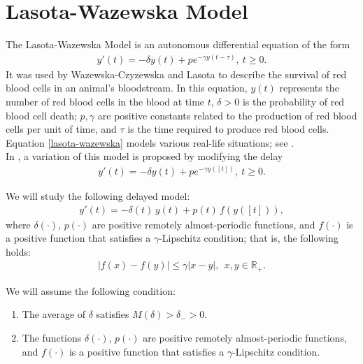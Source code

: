 \documentclass[english,,reqno]{amsart}
\numberwithin{equation}{section}
\newcommand{\bb}[1]{\mathbb{#1}}
\theoremstyle{plain}
\theoremstyle{definition}
\theoremstyle{remark}
\begin{document}
\section{Lasota-Wazewska Model}\label{sec7}


The Lasota-Wazewska Model is an autonomous differential equation of the form
\begin{eqnarray}
y'(t)=-\delta y(t)+pe^{-\gamma y(t-\tau )},\ t\geq 0. \label{lasota-wazewska}
\end{eqnarray}
It was used by Wazewska-Czyzewska and Lasota \cite{lasota-wazewska} to describe the survival of red blood cells in an animal's bloodstream.  
In this equation, $y(t)$ represents the number of red blood cells in the blood at time $t$,  
$\delta > 0$ is the probability of red blood cell death;  
$p, \gamma$ are positive constants related to the production of red blood cells per unit of time,  
and $\tau$ is the time required to produce red blood cells. \\  
Equation \eqref{lasota-wazewska} models various real-life situations; see \cite{liz-martinez}. \\  
In \cite{paper_lazota_depca}, a variation of this model is proposed by modifying the delay
\begin{eqnarray}
y'(t)=-\delta y(t)+pe^{-\gamma y([t])},\ t\geq 0. \label{lasota-wazewska_modificada}
\end{eqnarray}


We will study the following delayed model:  
\begin{eqnarray*}
y'(t) = -\delta(t)\, y(t) + p(t)\, f(y([t])), 
\end{eqnarray*}
where $\delta(\cdot)$, $p(\cdot)$ are positive remotely almost-periodic functions,  
and $f(\cdot)$ is a positive function that satisfies a $\gamma$-Lipschitz condition; that is, the following holds:
\begin{eqnarray*}
\vert f(x)-f(y) \vert \leq \gamma \vert x-y\vert,\ \ x,y\in \bb{R}_{+}.
\end{eqnarray*}

We will assume the following condition:  
\begin{enumerate}[label=\textbf{(LW.\arabic*)}]
\item\label{LW1} The average of $\delta$ satisfies $M(\delta) > \delta_{-} > 0$.
\item\label{LW2} The functions $\delta(\cdot)$, $p(\cdot)$ are positive remotely almost-periodic functions,  
and $f(\cdot)$ is a positive function that satisfies a $\gamma$-Lipschitz condition.
\end{enumerate}
\end{document}
